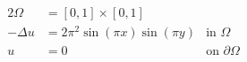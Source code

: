 \documentclass[A4,11pt]{article}
\begin{document}
\begin{alignat*}{2}
   \Omega &= [0,1] \times [0,1]       &\\
-\Delta u &= 2\pi^2\sin (\pi x) \sin(\pi y) & \text{in~} \Omega\\
        u &= 0                        & \text{on~} \partial\Omega
\end{alignat*}
\end{document}
